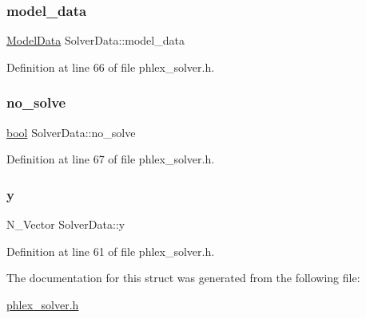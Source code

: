 \subsubsection{\texorpdfstring{model\+\_\+data}{model\_data}}
{\footnotesize\ttfamily \mbox{\hyperlink{struct_model_data}{Model\+Data}} Solver\+Data\+::model\+\_\+data}



Definition at line 66 of file phlex\+\_\+solver.\+h.

\mbox{\label{struct_solver_data_a1cb9c841b43b83f5b203419388fc45d5}} 
\subsubsection{\texorpdfstring{no\+\_\+solve}{no\_solve}}
{\footnotesize\ttfamily \mbox{\hyperlink{phlex__solver_8h_af6a258d8f3ee5206d682d799316314b1}{bool}} Solver\+Data\+::no\+\_\+solve}



Definition at line 67 of file phlex\+\_\+solver.\+h.

\mbox{\label{struct_solver_data_afb75942e94dd84088c7ea98b2b34249b}} 
\subsubsection{\texorpdfstring{y}{y}}
{\footnotesize\ttfamily N\+\_\+\+Vector Solver\+Data\+::y}



Definition at line 61 of file phlex\+\_\+solver.\+h.



The documentation for this struct was generated from the following file\+:\begin{DoxyCompactItemize}
\item 
\mbox{\hyperlink{phlex__solver_8h}{phlex\+\_\+solver.\+h}}\end{DoxyCompactItemize}
